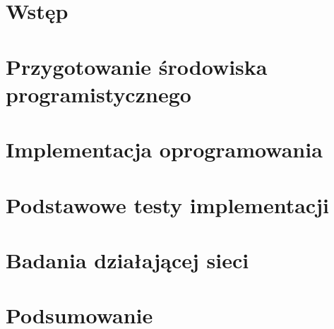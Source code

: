 \chapter{Wstęp}


\chapter{Przygotowanie środowiska programistycznego\label{sect:development}}


\chapter{Implementacja oprogramowania\label{sect:implementation}}


\chapter{Podstawowe testy implementacji\label{sect:testing}}


\chapter{Badania działającej sieci\label{sect:research}}


\chapter{Podsumowanie\label{sect:summary}}

